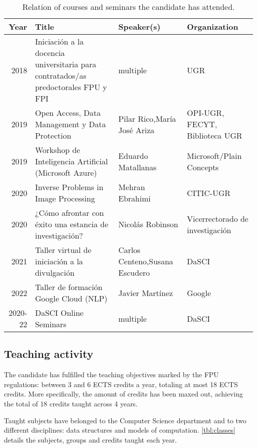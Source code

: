\begin{table*}[htbp]
    \begin{tabular}{rp{6cm}p{3.5cm}p{3.5cm}}
        \toprule
        \bfseries Year &\bfseries  Title &\bfseries  Speaker(s) &\bfseries  Organization \\
        \midrule
        2018 & Iniciación a la docencia universitaria para contratados/as predoctorales FPU y FPI & multiple & UGR \\
        2019 & Open Access, Data Management y Data Protection & Pilar Rico,\newline María José Ariza & OPI-UGR, FECYT, Biblioteca UGR \\
        2019 & Workshop de Inteligencia Artificial (Microsoft Azure) & Eduardo Matallanas & Microsoft/Plain Concepts\\
        2020 & Inverse Problems in Image Processing & Mehran Ebrahimi & CITIC-UGR \\
        2020 & ¿Cómo afrontar con éxito una estancia de investigación? & Nicolás Robinson & Vicerrectorado de investigación\\
        2021 & Taller virtual de iniciación a la divulgación & Carlos Centeno,\newline Susana Escudero & DaSCI \\
        2022 & Taller de formación Google Cloud (NLP) & Javier Martínez & Google \\
        2020-22 & DaSCI Online Seminars & multiple & DaSCI \\
        \bottomrule
    \end{tabular}
    \caption{\label{ch:formative}Relation of courses and seminars the candidate has attended.}
\end{table*}

\subsection{Teaching activity}

The candidate has fulfilled the teaching objectives marked by the FPU regulations: between 3 and 6 ECTS credits a year, totaling at most 18 ECTS credits. More specifically, the amount of credits has been maxed out, achieving the total of 18 credits taught across 4 years.

Taught subjects have belonged to the Computer Science department and to two different disciplines: data structures and models of computation. \autoref{tbl:classes} details the subjects, groups and credits taught each year.

